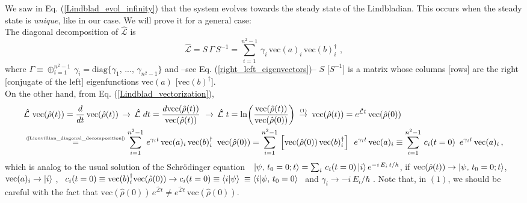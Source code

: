 \documentclass[11pt]{article}
\numberwithin{equation}{section} %
\numberwithin{figure}{section} %
\newcommand\numeq[1] %
  {\stackrel{\scriptscriptstyle(\mkern-1.5mu#1\mkern-1.5mu)}{=}}
\begin{document}
\begin{appendices}
We saw in Eq. (\ref{Lindblad_evol_infinity}) that the system evolves towards the steady state of the Lindbladian. This occurs when the steady state is \emph{unique}, like in our case. We will prove it for a general case:\\

The diagonal decomposition of $\hat{\mathcal{L}}$ is
\begin{equation} \label{Liouvillian_diagonal_decomposition}
\hat{\mathcal{L}}=S\,\Gamma\,S^{-1}=\sum_{i=1}^{n^2-1}\,\gamma_i\,\textrm{vec}(a)_i\,\textrm{vec}(b)^\dagger_i\,\,\textrm{,}
\end{equation}
where $\Gamma\equiv \oplus_{i=1}^{n^2-1}\,\gamma_i =\textrm{diag}\{ \gamma_1,\,...,\,\gamma_{n^2-1}\}$ and --see Eq. (\ref{right_left_eigenvectors})-- $S$ [$S^{-1}$] is a matrix whose columns [rows] are the right [conjugate of the left] eigenfunctions $\textrm{vec}(a)$ [$\textrm{vec}(b)^\dagger$].\\

On the other hand, from Eq. (\ref{Lindblad_vectorization}),
\begin{equation} \label{Liou_diag_decomp}
\begin{split}
&\hat{\mathcal{L}}\,\,\textrm{vec}(\hat{\rho}(t)) = \frac{d}{dt}\,\textrm{vec}(\hat{\rho}(t))\,\rightarrow\,\hat{\mathcal{L}}\,\,dt = \frac{d\textrm{vec}(\hat{\rho}(t))}{\textrm{vec}(\hat{\rho}(t))}\,\,\rightarrow\, \hat{\mathcal{L}}\,\,t = \ln(\frac{\textrm{vec}(\hat{\rho}(t))}{\textrm{vec}(\hat{\rho}(0))})   \,\,\,\newcommand\myeq1{\mathrel{\stackrel{\makebox[0pt]{\mbox{\normalfont\tiny \textrm{(1)}}}}{\rightarrow}}}\,\,\,\textrm{vec}(\hat{\rho}(t)) = e^{\hat{\mathcal{L}}t}\,\textrm{vec}(\hat{\rho}(0))\\
&\numeq{\textrm{\ref{Liouvillian_diagonal_decomposition}}}
\sum_{i=1}^{n^2-1}\,e^{\gamma_it}\,\textrm{vec}(a)_i\,\textrm{vec}(b)^\dagger_i\,\,\,\textrm{vec}(\hat{\rho}(0))= \sum_{i=1}^{n^2-1}\, \left[\textrm{vec}(\hat{\rho}(0))\,\textrm{vec}(b)^\dagger_i\right]\,\,\,e^{\gamma_it}\,\textrm{vec}(a)_i \equiv \sum_{i=1}^{n^2-1}\, c_i(t=0)\,\,\,e^{\gamma_it}\,\textrm{vec}(a)_i \,\textrm{,}
\end{split}
\end{equation}
which is analog to the usual solution of the Schrödinger equation \cite[p.~72, Eq.~(2.1.38)]{Sakurai} $\,\,$ $\ket{\psi,\,t_0=0; t}=\sum_i\,c_i(t=0)\ket{i}e^{-i\,E_i\,t/\hbar}$, if $\textrm{vec}(\hat{\rho}(t))\rightarrow \ket{\psi,\,t_0=0;t}$, $\,$ $\textrm{vec}(a)_i\rightarrow\ket{i}$ , $\,$ $c_i(t=0)\equiv\textrm{vec}(b)^\dagger_i \textrm{vec}(\hat{\rho}(0))\rightarrow c_i(t=0)\equiv \braket{i|\psi}$ $\equiv \braket{i|\psi,\,t_0=0}$ $\,$ and $\gamma_i\rightarrow -i\,E_i/\hbar$  . Note that, in $(1)$, we should be careful with the fact that $\textrm{vec}(\hat{\rho}(0))\,e^{\hat{\mathcal{L}}t} \neq e^{\hat{\mathcal{L}}t}\,\textrm{vec}(\hat{\rho}(0))$.


\end{appendices}
\end{document}
